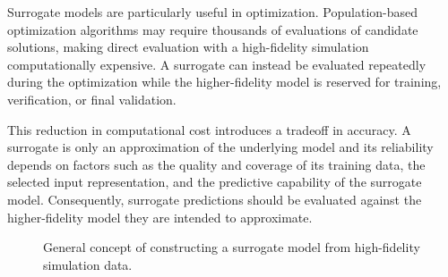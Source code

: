 \documentclass[11pt]{article}
\begin{document}
Surrogate models are particularly useful in optimization. Population-based optimization algorithms may require thousands of evaluations of candidate solutions, making direct evaluation with a high-fidelity simulation computationally expensive. A surrogate can instead be evaluated repeatedly during the optimization while the higher-fidelity model is reserved for training, verification, or final validation.

This reduction in computational cost introduces a tradeoff in accuracy. A surrogate is only an approximation of the underlying model and its reliability depends on factors such as the quality and coverage of its training data, the selected input representation, and the predictive capability of the surrogate model. Consequently, surrogate predictions should be evaluated against the higher-fidelity model they are intended to approximate.

\begin{figure}[htbp]
    \centering

    \caption{General concept of constructing a surrogate model from
    high-fidelity simulation data.}
    \label{fig:surrogate-concept}
\end{figure}


\end{document}
